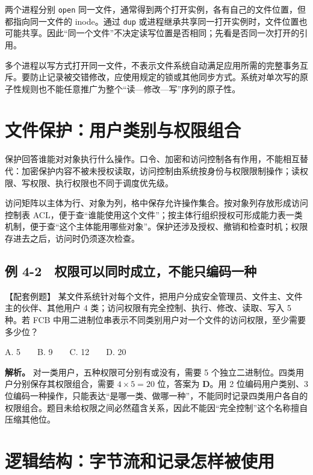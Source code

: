 两个进程分别 \texttt{open} 同一文件，通常得到两个打开实例，各有自己的文件位置，但都指向同一文件的 inode。通过 \texttt{dup} 或进程继承共享同一打开实例时，文件位置也可能共享。因此``同一个文件''不决定读写位置是否相同；先看是否同一次打开的引用。

多个进程以写方式打开同一文件，不表示文件系统自动满足应用所需的完整事务互斥。要防止记录被交错修改，应使用规定的锁或其他同步方式。系统对单次写的原子性规则也不能任意推广为整个``读---修改---写''序列的原子性。

\section{文件保护：用户类别与权限组合}\label{OS04-6-3}

保护回答谁能对对象执行什么操作。口令、加密和访问控制各有作用，不能相互替代：加密保护内容不被未授权读取，访问控制由系统按身份与权限限制操作；读权限、写权限、执行权限也不同于调度优先级。

访问矩阵以主体为行、对象为列，格中保存允许操作集合。按对象列存放形成访问控制表 ACL，便于查``谁能使用这个文件''；按主体行组织授权可形成能力表一类机制，便于查``这个主体能用哪些对象''。保护还涉及授权、撤销和检查时机；权限存进去之后，访问时仍须逐次检查。

\subsection{例 4-2　权限可以同时成立，不能只编码一种}\label{OS04-ex6-2}

\begin{example}[配套例题]

【配套例题】 某文件系统针对每个文件，把用户分成安全管理员、文件主、文件主的伙伴、其他用户 4 类；访问权限有完全控制、执行、修改、读取、写入 5 种。若 FCB 中用二进制位串表示不同类别用户对一个文件的访问权限，至少需要多少位？

A. 5　　B. 9　　C. 12　　D. 20

\end{example}

\textbf{解析。} 对一类用户，五种权限可分别有或没有，需要 5 个独立二进制位。四类用户分别保存其权限组合，需要 \(4\times5=20\) 位，答案为 \textbf{D}。用 2 位编码用户类别、3 位编码一种操作，只能表达``是哪一类、做哪一种''，不能同时记录四类用户各自的权限组合。题目未给权限之间必然蕴含关系，因此不能因``完全控制''这个名称擅自压缩其他位。

\section{逻辑结构：字节流和记录怎样被使用}\label{OS04-6-4}

